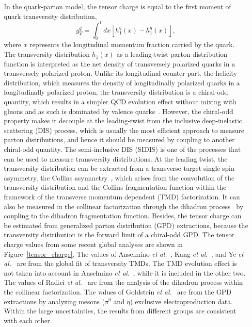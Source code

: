 \documentclass[aps,prd,twocolumn,groupedaddress,showpacs,superscriptaddress,floatfix,nofootinbib,10pt]{revtex4-1}
\begin{document}
In the quark-parton model, the tensor charge is equal to the first moment of quark transversity distribution,
\begin{equation}
g_T^{q}=\int_0^1 dx[h_1^q(x)-h_1^{\bar{q}}(x)],
\end{equation}
where $x$ represents the longitudinal momentum fraction carried by the quark. The transversity distribution $h_1(x)$ as a leading-twist parton distribution function is interpreted as the net density of transversely polarized quarks in a transversely polarized proton. Unlike its longitudinal counter part, the helicity distribution, which measures the density of longitudinally polarized quarks in a longitudinally polarized proton, the transversity distribution is a chiral-odd quantity, which results in a simpler QCD evolution effect without mixing with gluons and as such is dominated by valence quarks~\cite{Barone:2001sp}. However, the chiral-odd property makes it decouple at the leading-twist from the inclusive deep-inelastic scattering (DIS) process, which is usually the most efficient approach to measure parton distributions, and hence it should be measured by coupling to another chiral-odd quantity. The semi-inclusive DIS (SIDIS) is one of the processes that can be used to measure transversity distributions. At the leading twist, the transversity distribution can be extracted from a transverse target single spin asymmetry, the Collins asymmetry~\cite{Collins:1992kk}, which arises from the convolution of the transversity distribution and the Collins fragmentation function within the framework of the transverse momentum dependent (TMD) factorization. It can also be measured in the collinear factorization through the dihadron process~\cite{Bacchetta:2011ip} by coupling to the dihadron fragmentation function. Besides, the tensor charge can be estimated from generalized parton distribution (GPD) extractions, because the transversity distribution is the forward limit of a chiral-odd GPD. The tensor charge values from some recent global analyses are shown in Figure~\ref{tensor_charge}. The values of Anselmino {\it et al.}~\cite{Anselmino:2013vqa}, Kang {\it et al.}~\cite{Kang:2015msa}, and Ye {\it et al.}~\cite{Ye:2016prn} are from the global fit of transversity TMDs. The TMD evolution effect is not taken into account in Anselmino {\it et al.}~\cite{Anselmino:2013vqa}, while it is included in the other two. The values of Radici {\it et al.}~\cite{Radici:2015mwa} are from the analysis of the dihadron process within the collinear factorization. The values of Goldstein {\it et al.}~\cite{Goldstein:2014aja} are from the GPD extractions by analyzing mesons ($\pi^0$ and $\eta$) exclusive electroproduction data. Within the large uncertainties, the results from different groups are consistent with each other.
\end{document}
